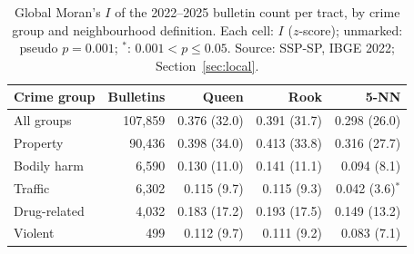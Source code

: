 \begin{table}[!ht]
\caption{Global Moran's $I$ of the 2022--2025 bulletin count per tract, by crime group and neighbourhood definition. Each cell: $I$ ($z$-score); unmarked: pseudo $p = 0.001$; $^{*}$: $0.001 < p \le 0.05$. Source: SSP-SP, IBGE 2022; Section~\ref{sec:local}.}
\label{tab:globalmoran}
\centering\footnotesize
\begin{tabular}{@{}lrrrr@{}}
\hline\hline
Crime group & Bulletins & Queen & Rook & 5-NN \\
\hline
All groups & 107,859 & 0.376 (32.0) & 0.391 (31.7) & 0.298 (26.0) \\
Property & 90,436 & 0.398 (34.0) & 0.413 (33.8) & 0.316 (27.7) \\
Bodily harm & 6,590 & 0.130 (11.0) & 0.141 (11.1) & 0.094 (8.1) \\
Traffic & 6,302 & 0.115 (9.7) & 0.115 (9.3) & 0.042 (3.6)$^{*}$ \\
Drug-related & 4,032 & 0.183 (17.2) & 0.193 (17.5) & 0.149 (13.2) \\
Violent & 499 & 0.112 (9.7) & 0.111 (9.2) & 0.083 (7.1) \\
\hline\hline
\end{tabular}
\end{table}
